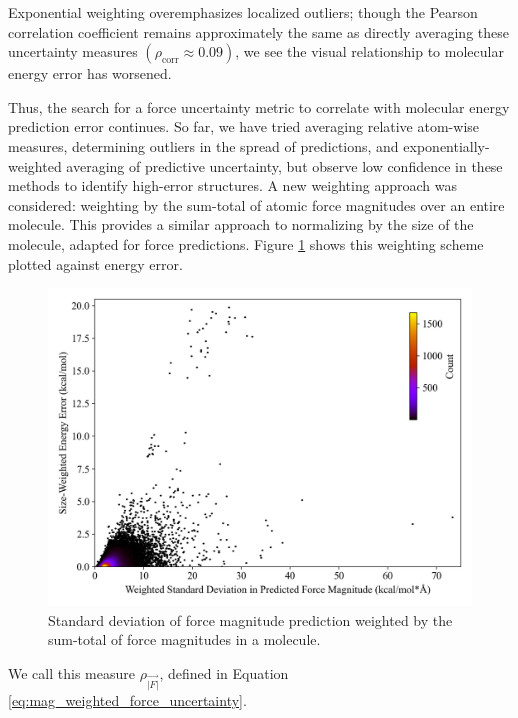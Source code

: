 Exponential weighting overemphasizes localized outliers; though the Pearson correlation coefficient remains approximately the same as directly averaging these uncertainty measures $(\rho_{\text{corr}} \approx 0.09)$, we see the visual relationship to molecular energy error has worsened. 

Thus, the search for a force uncertainty metric to correlate with molecular energy prediction error continues.
So far, we have tried averaging relative atom-wise measures, determining outliers in the spread of predictions, and exponentially-weighted averaging of predictive uncertainty, but observe low confidence in these methods to identify high-error structures. 
A new weighting approach was considered: weighting by the sum-total of atomic force magnitudes over an entire molecule.
This provides a similar approach to normalizing by the size of the molecule, adapted for force predictions.
Figure \ref{fig:forces_weighted_by_total_magnitudes} shows this weighting scheme plotted against energy error.

\begin{figure}[!hb]
    \centering
    \includegraphics[width=1\linewidth]{Images/2xr_forces/weighted_force_stdev-vs-energy_error.png}
    \caption[Standard deviation of force magnitude prediction weighted by the sum-total of force magnitudes in a molecule]{Standard deviation of force magnitude prediction weighted by the sum-total of force magnitudes in a molecule.}
    \label{fig:forces_weighted_by_total_magnitudes}
\end{figure}

We call this measure $\rho_{\vec{|F|}}$, defined in Equation \ref{eq:mag_weighted_force_uncertainty}.

